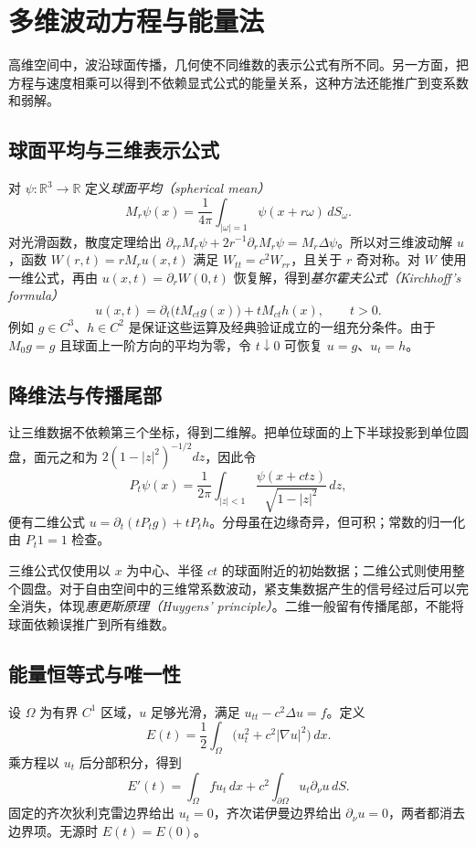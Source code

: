 \setcounter{chapter}{7} %
\chapter{多维波动方程与能量法}
\label{chap:wave-multi}

高维空间中，波沿球面传播，几何使不同维数的表示公式有所不同。另一方面，把方程与速度相乘可以得到不依赖显式公式的能量关系，这种方法还能推广到变系数和弱解。

\section{球面平均与三维表示公式}
对 $\psi:\mathbb R^3\to\mathbb R$ 定义\emph{球面平均（spherical mean）}
\[
 M_r\psi(x)=\frac1{4\pi}\int_{|\omega|=1}\psi(x+r\omega)\,dS_\omega.
\]
对光滑函数，散度定理给出 $\partial_{rr}M_r\psi+2r^{-1}\partial_rM_r\psi=M_r\Delta\psi$。所以对三维波动解 $u$，函数 $W(r,t)=rM_ru(x,t)$ 满足 $W_{tt}=c^2W_{rr}$，且关于 $r$ 奇对称。对 $W$ 使用一维公式，再由 $u(x,t)=\partial_rW(0,t)$ 恢复解，得到\emph{基尔霍夫公式（Kirchhoff's formula）}
\begin{equation}
 u(x,t)=\partial_t\bigl(tM_{ct}g(x)\bigr)+tM_{ct}h(x),\qquad t>0.
 \label{eq:kirchhoff}
\end{equation}
例如 $g\in C^3$、$h\in C^2$ 是保证这些运算及经典验证成立的一组充分条件。由于 $M_0g=g$ 且球面上一阶方向的平均为零，令 $t\downarrow0$ 可恢复 $u=g$、$u_t=h$。

\section{降维法与传播尾部}
让三维数据不依赖第三个坐标，得到二维解。把单位球面的上下半球投影到单位圆盘，面元之和为 $2(1-|z|^2)^{-1/2}dz$，因此令
\[
 P_t\psi(x)=\frac1{2\pi}\int_{|z|<1}\frac{\psi(x+ctz)}{\sqrt{1-|z|^2}}\,dz,
\]
便有二维公式 $u=\partial_t(tP_tg)+tP_th$。分母虽在边缘奇异，但可积；常数的归一化由 $P_t1=1$ 检查。

三维公式仅使用以 $x$ 为中心、半径 $ct$ 的球面附近的初始数据；二维公式则使用整个圆盘。对于自由空间中的三维常系数波动，紧支集数据产生的信号经过后可以完全消失，体现\emph{惠更斯原理（Huygens' principle）}。二维一般留有传播尾部，不能将球面依赖误推广到所有维数。

\section{能量恒等式与唯一性}
设 $\Omega$ 为有界 $C^1$ 区域，$u$ 足够光滑，满足 $u_{tt}-c^2\Delta u=f$。定义
\begin{equation}
 E(t)=\frac12\int_\Omega\bigl(u_t^2+c^2|\nabla u|^2\bigr)\,dx.
 \label{eq:wave-energy}
\end{equation}
乘方程以 $u_t$ 后分部积分，得到
\begin{equation}
 E'(t)=\int_\Omega f u_t\,dx+c^2\int_{\partial\Omega}u_t\partial_\nu u\,dS.
 \label{eq:wave-energy-balance}
\end{equation}
固定的齐次狄利克雷边界给出 $u_t=0$，齐次诺伊曼边界给出 $\partial_\nu u=0$，两者都消去边界项。无源时 $E(t)=E(0)$。

